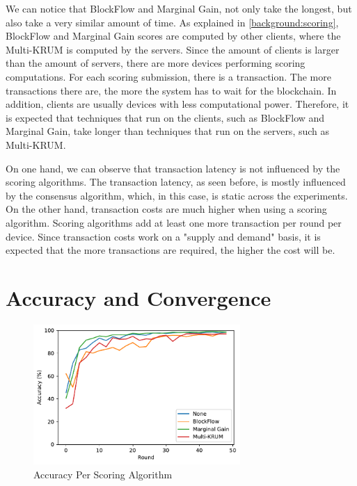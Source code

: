 We can notice that BlockFlow and Marginal Gain, not only take the longest, but also take a very similar amount of time. As explained in \autoref{background:scoring}, BlockFlow and Marginal Gain scores are computed by other clients, where the Multi-KRUM is computed by the servers. Since the amount of clients is larger than the amount of servers, there are more devices performing scoring computations. For each scoring submission, there is a transaction. The more transactions there are, the more the system has to wait for the blockchain. In addition, clients are usually devices with less computational power. Therefore, it is expected that techniques that run on the clients, such as BlockFlow and Marginal Gain, take longer than techniques that run on the servers, such as Multi-KRUM.

On one hand, we can observe that transaction latency is not influenced by the scoring algorithms. The transaction latency, as seen before, is mostly influenced by the consensus algorithm, which, in this case, is static across the experiments. On the other hand, transaction costs are much higher when using a scoring algorithm. Scoring algorithms add at least one more transaction per round per device. Since transaction costs work on a "supply and demand" basis, it is expected that the more transactions are required, the higher the cost will be.

\section{Accuracy and Convergence}

\begin{figure}[!ht]
    \centering
    \centering
    \includegraphics[width=0.7\textwidth]{graphics/scoring/accuracy.pdf}
    \caption{Accuracy Per Scoring Algorithm}
    \label{fig:accuracy_scoring}
\end{figure}

